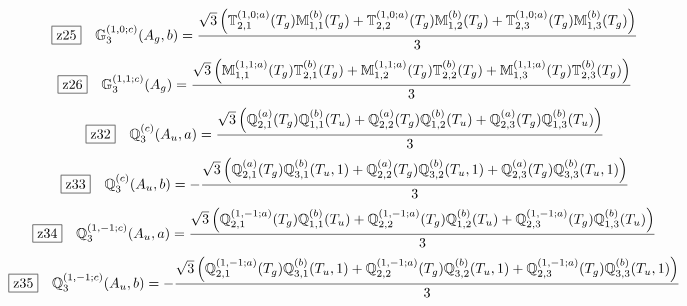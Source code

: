 \documentclass[fleqn,10pt,landscape]{jsarticle}
\begin{document}
\begin{dmath*}
\hspace*{3mm}\fbox{z25}\quad \mathbb{G}_{3}^{(1,0;c)}(A_{g},b)=\frac{\sqrt{3} \left(\mathbb{T}_{2,1}^{(1,0;a)}(T_{g}) \mathbb{M}_{1,1}^{(b)}(T_{g}) + \mathbb{T}_{2,2}^{(1,0;a)}(T_{g}) \mathbb{M}_{1,2}^{(b)}(T_{g}) + \mathbb{T}_{2,3}^{(1,0;a)}(T_{g}) \mathbb{M}_{1,3}^{(b)}(T_{g})\right)}{3}
\end{dmath*}
\begin{dmath*}
\hspace*{3mm}\fbox{z26}\quad \mathbb{G}_{3}^{(1,1;c)}(A_{g})=\frac{\sqrt{3} \left(\mathbb{M}_{1,1}^{(1,1;a)}(T_{g}) \mathbb{T}_{2,1}^{(b)}(T_{g}) + \mathbb{M}_{1,2}^{(1,1;a)}(T_{g}) \mathbb{T}_{2,2}^{(b)}(T_{g}) + \mathbb{M}_{1,3}^{(1,1;a)}(T_{g}) \mathbb{T}_{2,3}^{(b)}(T_{g})\right)}{3}
\end{dmath*}
\begin{dmath*}
\hspace*{3mm}\fbox{z32}\quad \mathbb{Q}_{3}^{(c)}(A_{u},a)=\frac{\sqrt{3} \left(\mathbb{Q}_{2,1}^{(a)}(T_{g}) \mathbb{Q}_{1,1}^{(b)}(T_{u}) + \mathbb{Q}_{2,2}^{(a)}(T_{g}) \mathbb{Q}_{1,2}^{(b)}(T_{u}) + \mathbb{Q}_{2,3}^{(a)}(T_{g}) \mathbb{Q}_{1,3}^{(b)}(T_{u})\right)}{3}
\end{dmath*}
\begin{dmath*}
\hspace*{3mm}\fbox{z33}\quad \mathbb{Q}_{3}^{(c)}(A_{u},b)=- \frac{\sqrt{3} \left(\mathbb{Q}_{2,1}^{(a)}(T_{g}) \mathbb{Q}_{3,1}^{(b)}(T_{u},1) + \mathbb{Q}_{2,2}^{(a)}(T_{g}) \mathbb{Q}_{3,2}^{(b)}(T_{u},1) + \mathbb{Q}_{2,3}^{(a)}(T_{g}) \mathbb{Q}_{3,3}^{(b)}(T_{u},1)\right)}{3}
\end{dmath*}
\begin{dmath*}
\hspace*{3mm}\fbox{z34}\quad \mathbb{Q}_{3}^{(1,-1;c)}(A_{u},a)=\frac{\sqrt{3} \left(\mathbb{Q}_{2,1}^{(1,-1;a)}(T_{g}) \mathbb{Q}_{1,1}^{(b)}(T_{u}) + \mathbb{Q}_{2,2}^{(1,-1;a)}(T_{g}) \mathbb{Q}_{1,2}^{(b)}(T_{u}) + \mathbb{Q}_{2,3}^{(1,-1;a)}(T_{g}) \mathbb{Q}_{1,3}^{(b)}(T_{u})\right)}{3}
\end{dmath*}
\begin{dmath*}
\hspace*{3mm}\fbox{z35}\quad \mathbb{Q}_{3}^{(1,-1;c)}(A_{u},b)=- \frac{\sqrt{3} \left(\mathbb{Q}_{2,1}^{(1,-1;a)}(T_{g}) \mathbb{Q}_{3,1}^{(b)}(T_{u},1) + \mathbb{Q}_{2,2}^{(1,-1;a)}(T_{g}) \mathbb{Q}_{3,2}^{(b)}(T_{u},1) + \mathbb{Q}_{2,3}^{(1,-1;a)}(T_{g}) \mathbb{Q}_{3,3}^{(b)}(T_{u},1)\right)}{3}
\end{dmath*}
\end{document}
